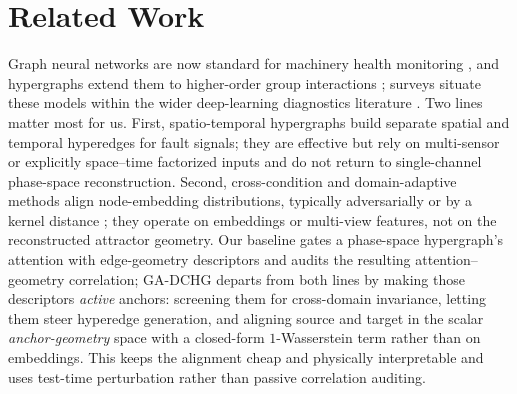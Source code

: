 \section{Related Work}
\label{sec:related}

Graph neural networks are now standard for machinery health monitoring
\cite{li2021hg,li2021mrfcn}, and hypergraphs extend them to
higher-order group interactions \cite{feng2019,wang2023hyp}; surveys
situate these models within the wider deep-learning diagnostics literature
\cite{zhao2020,lei2020}. Two lines matter most for us. First,
spatio-temporal hypergraphs \cite{bao2025sthfd,liu2026mat} build separate
spatial and temporal hyperedges for fault signals; they are effective but rely on
multi-sensor or explicitly space--time factorized inputs and do not return to
single-channel phase-space reconstruction. Second, cross-condition and
domain-adaptive methods align node-embedding distributions, typically
adversarially or by a kernel distance \cite{li2025amh,ganin2016domain,
gretton2012kernel,arjovsky2017wgan,pan2010survey,long2015learning}; they operate
on embeddings or multi-view features, not on the reconstructed attractor
geometry. Our baseline gates a phase-space hypergraph's attention with
edge-geometry descriptors and audits the resulting attention--geometry
correlation; GA-DCHG departs from both lines by making those descriptors
\emph{active} anchors: screening them for cross-domain invariance, letting them
steer hyperedge generation, and aligning source and target in the scalar
\emph{anchor-geometry} space with a closed-form $1$-Wasserstein term rather than
on embeddings. This keeps the alignment cheap and physically interpretable and
uses test-time perturbation rather than passive correlation auditing.
